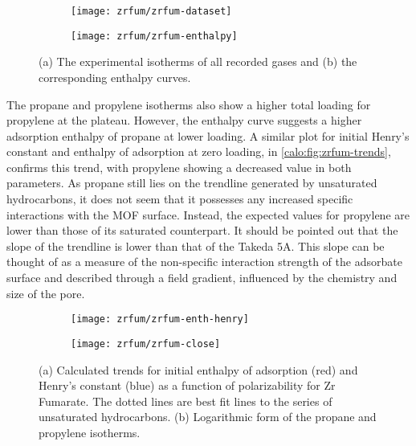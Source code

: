 \begin{figure}[htb]
    \centering

	\begin{subfigure}[b]{.45\textwidth}
        \centering
        \texttt{[image: zrfum/zrfum-dataset]}
        \caption{}%
        \label{calo:fig:zrfum-dataset}
    \end{subfigure}%
	\quad
	\begin{subfigure}[b]{.45\textwidth}
        \centering
        \texttt{[image: zrfum/zrfum-enthalpy]}
        \caption{}%
        \label{calo:fig:zrfum-enthalpy}
    \end{subfigure}
    \caption{(a) The experimental isotherms of all recorded gases and
    (b) the corresponding enthalpy curves.}%
    \label{calo:fig:zrfum-data}

\end{figure}

The propane and propylene isotherms also show a higher total
loading for propylene at the plateau. However, the enthalpy
curve suggests a higher adsorption enthalpy of propane at lower
loading. A similar plot for initial Henry's constant and
enthalpy of adsorption at zero loading, in \autoref{calo:fig:zrfum-trends},
confirms this trend, with propylene showing a decreased value
in both parameters. As propane still lies on the trendline generated
by unsaturated hydrocarbons, it does not seem that it possesses any
increased specific interactions with the \gls{MOF} surface. Instead, 
the expected values for propylene are lower than those of its
saturated counterpart. It should be pointed out that the
slope of the trendline is lower than that of the Takeda 5A. This slope 
can be thought of as a measure of the non-specific interaction strength
of the adsorbate surface and described through a field gradient,
influenced by the chemistry and size of the pore.

\begin{figure}[htb]
    \centering
    
    \begin{subfigure}[b]{0.5\textwidth}
        \centering
        \texttt{[image: zrfum/zrfum-enth-henry]}
        \caption{}%
        \label{calo:fig:zrfum-trends}
    \end{subfigure}%
    \begin{subfigure}[b]{0.45\textwidth}
        \centering
        \texttt{[image: zrfum/zrfum-close]}
        \caption{}%
        \label{calo:fig:zrfum-close}
    \end{subfigure}%
    \caption{(a) Calculated trends for initial enthalpy of adsorption (red) and 
    Henry's constant (blue) as a function of polarizability for 
    Zr Fumarate. The dotted lines are best fit lines to 
    the series of unsaturated hydrocarbons. (b) Logarithmic form of the 
    propane and propylene isotherms.}%
    \label{calo:fig:zrfum-analysis}

\end{figure}

